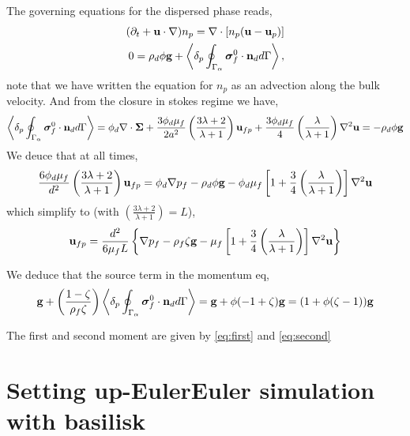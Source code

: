 The governing equations for the dispersed phase reads,
\begin{align}
    (\partial_t + \textbf{u} \cdot \mathbf{\nabla})n_p = \mathbf{\nabla}\cdot[n_p(\textbf{u} - \textbf{u}_p)]\\
    0 
    = 
    \rho_d \phi \textbf{g}
    + \left<\delta_p \oint_{\Gamma_{\alpha}} {\bm{\sigma}_f^0 \cdot \textbf{n}_d} d\Gamma\right>,
\end{align}
note that we have written the equation for $n_p$ as an advection along the bulk velocity. 
And from the closure in stokes regime we have, 
\begin{equation*}
    \left<\delta_p \oint_{\Gamma_{\alpha}} \bm{\sigma}_f^0\cdot \textbf{n}_d d\Gamma\right> = 
    \phi_d \mathbf{\nabla}\cdot\bm\Sigma
    + \frac{3\phi_d\mu_f}{2 a^2} 
    \left(\frac{3\lambda+2}{\lambda+1}\right) \textbf{u}_{f p} 
    + \frac{3\phi_d\mu_f}{4} \left(\frac{\lambda}{\lambda+1}\right)\mathbf{\nabla}^2\textbf{u}
    = - 
    \rho_d \phi \textbf{g}
\end{equation*}
We deuce that at all times, 
\begin{align*}
    \frac{6\phi_d\mu_f}{d^2} 
    \left(\frac{3\lambda+2}{\lambda+1}\right) \textbf{u}_{f p} 
    = 
    \phi_d \mathbf{\nabla} p_f
    - \rho_d \phi \textbf{g}
    - \phi_d \mu_f \left[
        1 + \frac{3}{4} \left(\frac{\lambda}{\lambda+1}\right)
    \right]\mathbf{\nabla}^2 \textbf{u}
\end{align*}
which simplify to (with $\left(\frac{3\lambda+2}{\lambda+1}\right) = L$), 
\begin{align*}
   \textbf{u}_{f p} 
    = 
    \frac{d^2}{6\mu_f L }
    \left\{
        \mathbf{\nabla} p_f
        - \rho_f\zeta   \textbf{g}
        -  \mu_f \left[
            1 + \frac{3}{4} \left(\frac{\lambda}{\lambda+1}\right)
            \right]\mathbf{\nabla}^2 \textbf{u}
    \right\}
\end{align*}


We deduce that the source term in the momentum eq, 
\begin{equation*}
    \textbf{g} 
    + \left(\frac{1-\zeta}{\rho_f\zeta}\right)
    \left<\delta_p \oint_{\Gamma_{\alpha}} {\bm{\sigma}_f^0 \cdot \textbf{n}_d} d\Gamma\right>
    =
    \textbf{g}
    +  
    \phi (- 1 + \zeta)
    \textbf{g}
    = (1 + \phi(\zeta-1) )\textbf{g}
\end{equation*}

The first and second moment are given by \ref{eq:first} and \ref{eq:second}

\section{Setting up-EulerEuler simulation with basilisk}


